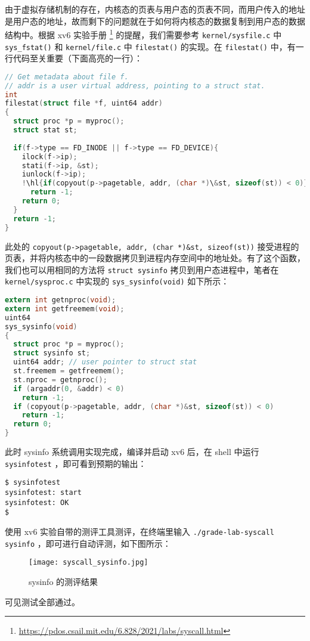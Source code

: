 由于虚拟存储机制的存在，内核态的页表与用户态的页表不同，而用户传入的地址是用户态的地址，故而剩下的问题就在于如何将内核态的数据复制到用户态的数据结构中。根据 xv6 实验手册 \footnote{\url{https://pdos.csail.mit.edu/6.828/2021/labs/syscall.html}} 的提醒，我们需要参考 \lstinline{kernel/sysfile.c} 中 \lstinline{sys_fstat()} 和 \lstinline{kernel/file.c} 中 \lstinline{filestat()} 的实现。在 \lstinline{filestat()} 中，有一行代码至关重要（下面高亮的一行）：
\begin{lstlisting}[language=C,escapechar={!}]
// Get metadata about file f.
// addr is a user virtual address, pointing to a struct stat.
int
filestat(struct file *f, uint64 addr)
{
  struct proc *p = myproc();
  struct stat st;
  
  if(f->type == FD_INODE || f->type == FD_DEVICE){
    ilock(f->ip);
    stati(f->ip, &st);
    iunlock(f->ip);
    !\hl{if(copyout(p->pagetable, addr, (char *)\&st, sizeof(st)) < 0)}!
      return -1;
    return 0;
  }
  return -1;
}
\end{lstlisting}

此处的 \lstinline{copyout(p->pagetable, addr, (char *)&st, sizeof(st))} 接受进程的页表，并将内核态中的一段数据拷贝到进程内存空间中的地址处。有了这个函数，我们也可以用相同的方法将 \lstinline{struct sysinfo} 拷贝到用户态进程中，笔者在 \lstinline{kernel/sysproc.c} 中实现的 \lstinline{sys_sysinfo(void)} 如下所示：
\begin{lstlisting}[language=C]
extern int getnproc(void);
extern int getfreemem(void);
uint64
sys_sysinfo(void)
{
  struct proc *p = myproc();
  struct sysinfo st;
  uint64 addr; // user pointer to struct stat
  st.freemem = getfreemem();
  st.nproc = getnproc();
  if (argaddr(0, &addr) < 0)
    return -1;
  if (copyout(p->pagetable, addr, (char *)&st, sizeof(st)) < 0)
    return -1;
  return 0;
}
\end{lstlisting}

此时 sysinfo 系统调用实现完成，编译并启动 xv6 后，在 shell 中运行 \lstinline{sysinfotest} ，即可看到预期的输出：
\begin{lstlisting}
$ sysinfotest
sysinfotest: start
sysinfotest: OK
$ 
\end{lstlisting}

使用 xv6 实验自带的测评工具测评，在终端里输入 \lstinline{./grade-lab-syscall sysinfo} ，即可进行自动评测，如下图所示：
\begin{figure}[H]
  \centering
  \texttt{[image: syscall\_sysinfo.jpg]}
  \caption{ sysinfo 的测评结果}
\end{figure}
可见测试全部通过。

